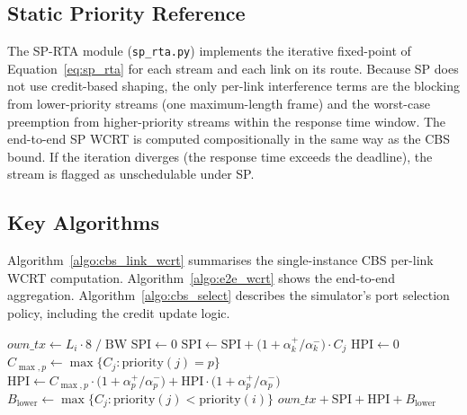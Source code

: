 \documentclass[11pt,a4paper]{article}
\begin{document}
\subsection{Static Priority Reference}

The SP-RTA module (\texttt{sp\_rta.py}) implements the iterative fixed-point
of Equation~\eqref{eq:sp_rta} for each stream and each link on its route.
Because SP does not use credit-based shaping, the only per-link interference
terms are the blocking from lower-priority streams (one maximum-length frame)
and the worst-case preemption from higher-priority streams within the
response time window.
The end-to-end SP WCRT is computed compositionally in the same way as the
CBS bound.
If the iteration diverges (the response time exceeds the deadline), the
stream is flagged as unschedulable under SP.

\subsection{Key Algorithms}

Algorithm~\ref{algo:cbs_link_wcrt} summarises the single-instance CBS
per-link WCRT computation.
Algorithm~\ref{algo:e2e_wcrt} shows the end-to-end aggregation.
Algorithm~\ref{algo:cbs_select} describes the simulator's port selection
policy, including the credit update logic.

\begin{algorithm}[H]
\caption{Compute Single-Instance CBS Link WCRT}
\label{algo:cbs_link_wcrt}
\begin{algorithmic}[1]
    \State $own\_tx \gets L_i \cdot 8 \;/\; \mathrm{BW}$
    \State $\text{SPI} \gets 0$
        \State $\text{SPI} \gets \text{SPI} + \bigl(1 + \alpha_k^+ / \alpha_k^-\bigr) \cdot C_j$
    \EndFor
    \State $\text{HPI} \gets 0$
        \State $C_{\max,p} \gets \max\{C_j : \text{priority}(j) = p\}$
        \State $\text{HPI} \gets C_{\max,p} \cdot \bigl(1 + \alpha_p^+ / \alpha_p^-\bigr) + \text{HPI} \cdot \bigl(1 + \alpha_p^+ / \alpha_p^-\bigr)$
    \EndFor
    \State $B_{\mathrm{lower}} \gets \max\{C_j : \text{priority}(j) < \text{priority}(i)\}$
    \State \Return $own\_tx + \text{SPI} + \text{HPI} + B_{\mathrm{lower}}$
\EndProcedure
\end{algorithmic}
\end{algorithm}
\end{document}
